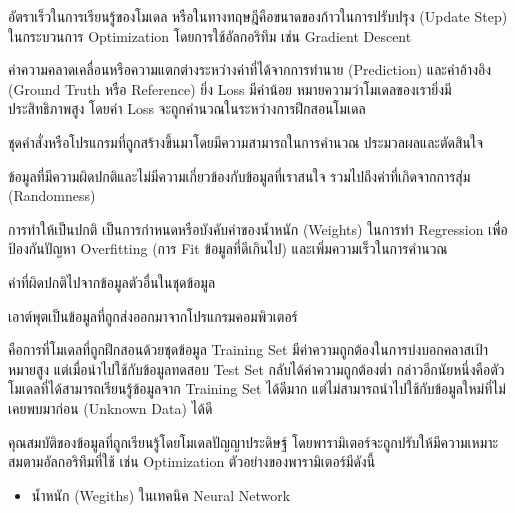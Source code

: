 \begin{description}[style=nextline]
    \item[Learning Rate] อัตราเร็วในการเรียนรู้ของโมเดล หรือในทางทฤษฎีคือขนาดของก้าวในการปรับปรุง (Update Step) ในกระบวนการ Optimization โดยการใช้อัลกอริทึม เช่น Gradient Descent

    \item[Loss] ค่าความคลาดเคลื่อนหรือความแตกต่างระหว่างค่าที่ได้จากการทำนาย (Prediction) และค่าอ้างอิง (Ground Truth หรือ Reference) ยิ่ง Loss มีค่าน้อย หมายความว่าโมเดลของเรายิ่งมีประสิทธิภาพสูง โดยค่า Loss จะถูกคำนวณในระหว่างการฝึกสอนโมเดล

    \item[Model] ชุดคำสั่งหรือโปรแกรมที่ถูกสร้างขึ้นมาโดยมีความสามารถในการคำนวณ ประมวลผลและตัดสินใจ

    \item[Noise] ข้อมูลที่มีความผิดปกติและไม่มีความเกี่ยวข้องกับข้อมูลที่เราสนใจ รวมไปถึงค่าที่เกิดจากการสุ่ม (Randomness)

    \item[Normalization] การทำให้เป็นปกติ เป็นการกำหนดหรือบังคับค่าของน้ำหนัก (Weights) ในการทำ Regression เพื่อป้องกันปัญหา Overfitting (การ Fit ข้อมูลที่ดีเกินไป) และเพิ่มความเร็วในการคำนวณ

    \item[Outlier] ค่าที่ผิดปกติไปจากข้อมูลตัวอื่นในชุดข้อมูล

    \item[Output] เอาต์พุตเป็นข้อมูลที่ถูกส่งออกมาจากโปรแกรมคอมพิวเตอร์

    \item[Overfitting] คือการที่โมเดลที่ถูกฝึกสอนด้วยชุดข้อมูล Training Set มีค่าความถูกต้องในการบ่งบอกคลาสเป้าหมายสูง แต่เมื่อนำไปใช้กับข้อมูลทดสอบ Test Set กลับได้ค่าความถูกต้องต่ำ กล่าวอีกนัยหนึ่งคือตัวโมเดลที่ได้สามารถเรียนรู้ข้อมูลจาก Training Set ได้ดีมาก แต่ไม่สามารถนำไปใช้กับข้อมูลใหม่ที่ไม่เคยพบมาก่อน (Unknown Data) ได้ดี

    \item[Parameter] คุณสมบัติของข้อมูลที่ถูกเรียนรู้โดยโมเดลปัญญาประดิษฐ์ โดยพารามิเตอร์จะถูกปรับให้มีความเหมาะสมตามอัลกอริทึมที่ใช้ เช่น Optimization ตัวอย่างของพารามิเตอร์มีดังนี้
    \begin{itemize}
        \item น้ำหนัก (Wegiths) ในเทคนิค Neural Network
        

\end{itemize}
\end{description}
